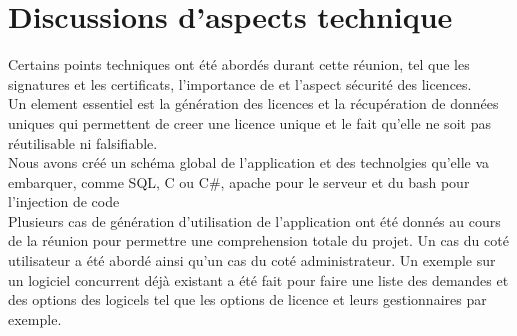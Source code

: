 \documentclass{article}
\begin{document}
\section{Discussions d'aspects technique}

Certains points techniques ont été abordés durant cette réunion, tel que les signatures et les certificats, l'importance de
et l'aspect sécurité des licences.\\

Un element essentiel est la génération des licences et la récupération de données uniques qui permettent de creer une licence unique et le fait qu'elle ne soit pas réutilisable  
ni falsifiable.\\

Nous avons créé un schéma global de l'application et des technolgies qu'elle va embarquer, comme SQL, C ou C\#, apache pour le serveur et 
du bash pour l'injection de code\\

Plusieurs cas de génération d'utilisation de l'application ont été donnés au cours de la réunion pour permettre une comprehension totale du projet.
Un cas du coté utilisateur a été abordé ainsi qu'un cas du coté administrateur. Un exemple sur un logiciel concurrent déjà existant a été fait pour faire une liste
des demandes et des options des logicels tel que les options de licence et leurs gestionnaires par exemple.
\newpage
\end{document}
